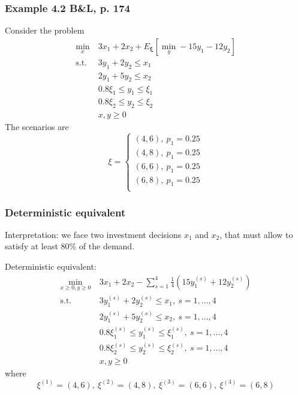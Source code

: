 \documentclass{beamer}
\def\bxi{\boldsymbol\xi}
\def\bxi{\boldsymbol\xi}
\begin{document}
\begin{frame}
\frametitle{Example 4.2 B\&L, p. 174}

Consider the problem
\begin{align*}
	\min_x\ & 3x_1 + 2x_2 + E_{\bxi}[\min_y -15y_1-12y_2] \\
	\mbox{s.t. } & 3y_1 + 2y_2 \leq x_1 \\
	& 2y_1 + 5y_2 \leq x_2 \\
	& 0.8 \xi_1 \leq y_1 \leq \xi_1 \\
	& 0.8 \xi_2 \leq y_2 \leq \xi_2 \\
	& x, y \geq 0
\end{align*}
The scenarios are
\[
\xi =
\begin{cases}
(4,6),\ p_1 = 0.25 \\
(4,8),\ p_1 = 0.25 \\
(6,6),\ p_1 = 0.25 \\
(6,8),\ p_1 = 0.25 \\
\end{cases}
\]

\end{frame}

\begin{frame}
\frametitle{Deterministic equivalent}

{\red Interpretation}: we face two investment decisions $x_1$ and $x_2$,
that must allow to satisfy at least 80\% of the demand.

{\red Deterministic equivalent}:
\begin{align*}
\min_{x \geq 0, y \geq 0}\ & 3x_1 + 2x_2 - \sum_{s = 1}^4 \frac{1}{4} \left( 15y^{(s)}_1+12y^{(s)}_2 \right) \\
\mbox{s.t. } & 3y^{(s)}_1 + 2y^{(s)}_2 \leq x_1,\ s = 1,\ldots,4 \\
& 2y^{(s)}_1 + 5y^{(s)}_2 \leq x_2,\ s = 1,\ldots,4 \\
& 0.8 \xi^{(s)}_1 \leq y^{(s)}_1 \leq \xi^{(s)}_1,\ s = 1,\ldots,4 \\
& 0.8 \xi^{(s)}_2 \leq y^{(s)}_2 \leq \xi^{(s)}_2,\ s = 1,\ldots,4 \\
& x, y \geq 0
\end{align*}
where
$$
\xi^{(1)} = (4,6),\ 
\xi^{(2)} = (4,8), \
\xi^{(3)} = (6,6),\ 
\xi^{(4)} = (6,8)
$$

\end{frame}
\end{document}
